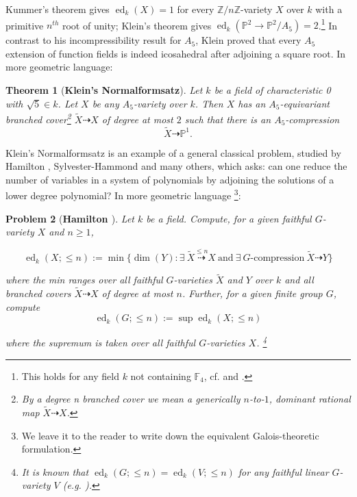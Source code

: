 \documentclass[11pt]{amsart}
\newtheorem{theorem}{Theorem}[section]
\newtheorem{problem}[theorem]{Problem}
\theoremstyle{definition}
\numberwithin{equation}{section}
\newcommand{\Pb}{\mathbb{P}}
\newcommand{\Zb}{\mathbb{Z}}
\DeclareMathOperator{\ed}{ed}
\begin{document}
Kummer's theorem gives $\ed_k(X)=1$ for every $\Zb/n\Zb$-variety $X$ over $k$ with a primitive $n^{th}$ root of unity; Klein's theorem gives $\ed_k(\Pb^2\to \Pb^2/A_5)=2$.\footnote{This holds for any field $k$ not containing $\mathbb{F}_4$, cf.  \cite[Proposition 5]{Ledet} and \cite[Theorem 1.6]{CHKZ}.}  In contrast to his incompressibility result for $A_5$, Klein proved that every $A_5$ extension of function fields is indeed icosahedral after adjoining a square root.  In more geometric language: 

\begin{theorem}[{\bf Klein's Normalformsatz}]
\label{theorem:normalformsatz}
Let $k$ be a field of characteristic 0 with $\sqrt{5}\in k$. Let $X$ be any $A_5$-variety over $k$.  Then $X$ has an 
$A_5$-equivariant branched cover\footnote{By a {\em degree n branched cover} we mean a generically $n$-to-$1$, dominant rational map $\tilde{X}\dashrightarrow X$.} $\widetilde X\dashrightarrow X$ of 
degree at most $2$  
 such that there is an 
$A_5$-compression \[\widetilde{X}\dashrightarrow \Pb^1.\] 
\end{theorem}

Klein's Normalformsatz is an example of a general classical problem, studied by Hamilton \cite{Ham}, Sylvester-Hammond \cite[p.1]{SH} and many others, which asks:  can one reduce the number of variables 
in a system of polynomials by adjoining the solutions of a lower degree polynomial?  In more geometric language \footnote{We leave it to the reader to write down the equivalent Galois-theoretic formulation.}:

\begin{problem}[{\bf Hamilton \cite{Ham}}]
\label{problem:main}
Let $k$ be a field. Compute, for a given faithful $G$-variety $X$ and $n\geq 1$,

\begin{equation}
\label{eq:reled}
\ed_k(X;\leq n):=\min\{\dim(Y) : \exists \ \widetilde{X}\stackrel{\leq n}{\dashrightarrow}X \ \text{and}\ \exists \ \text{$G$-compression}\  
\widetilde{X}\dashrightarrow Y\}
\end{equation}

\vspace{.2cm}
where the min ranges over all faithful $G$-varieties $\widetilde{X}$ and $Y$ over $k$ and all branched covers $\widetilde{X}\dashrightarrow X$ of degree at most $n$.  Further, for a given finite group $G$, compute 
\begin{equation}
\label{eq:reled2}
			\ed_k(G;\leq n):=\sup \ed_k(X;\leq n)
\end{equation}

\vspace{.2cm}
where the supremum is taken over all faithful $G$-varieties $X$.  \footnote{It is known that $\ed_k(G;\leq n)=\ed_k(V;\leq n)$ for any faithful linear $G$-variety $V$ (e.g. \cite[Example 4.6 and Lemma 4.9]{FKW2}). }
\end{problem}
\end{document}
